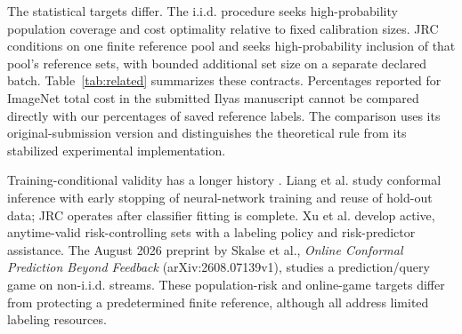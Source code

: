 \documentclass[pdflatex,sn-basic,Numbered,iicol]{sn-jnl}
\begin{document}
The statistical targets differ. The i.i.d. procedure seeks high-probability population coverage and cost optimality relative to fixed calibration sizes. JRC conditions on one finite reference pool and seeks high-probability inclusion of that pool's reference sets, with bounded additional set size on a separate declared batch. Table~\ref{tab:related} summarizes these contracts. Percentages reported for ImageNet total cost in the submitted Ilyas manuscript cannot be compared directly with our percentages of saved reference labels. The comparison uses its original-submission version and distinguishes the theoretical rule from its stabilized experimental implementation.

Training-conditional validity has a longer history \cite{vovk2012}. Liang et al. \cite{liangstop} study conformal inference with early stopping of neural-network training and reuse of hold-out data; JRC operates after classifier fitting is complete. Xu et al. \cite{active2024} develop active, anytime-valid risk-controlling sets with a labeling policy and risk-predictor assistance. The August 2026 preprint by Skalse et al., \emph{Online Conformal Prediction Beyond Feedback} (arXiv:2608.07139v1), studies a prediction/query game on non-i.i.d. streams. These population-risk and online-game targets differ from protecting a predetermined finite reference, although all address limited labeling resources.
\end{document}
